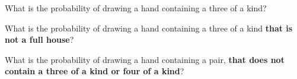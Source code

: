%
\begin{frame}

What is the probability of drawing a hand containing a three of a kind?

\hfill

What is the probability of drawing a hand containing a three of a kind \textbf{that is
not a full house}?

\hfill

What is the probability of drawing a hand containing a pair, \textbf{that does
not contain a three of a kind or four of a kind}?

\end{frame}
